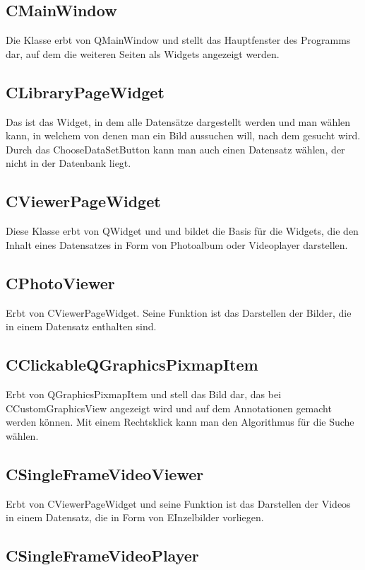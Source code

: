 \subsection*{CMainWindow}
Die Klasse erbt von QMainWindow und stellt das Hauptfenster des Programms dar, auf dem die weiteren Seiten als Widgets angezeigt werden.

\subsection*{CLibraryPageWidget}
Das ist das Widget, in dem alle Datensätze dargestellt werden und man wählen kann, in welchem von denen man ein Bild aussuchen will, nach dem gesucht wird. Durch das ChooseDataSetButton kann man auch einen Datensatz wählen, der nicht in der Datenbank liegt. 

\subsection*{CViewerPageWidget}
Diese Klasse erbt von QWidget und und bildet die Basis für die Widgets, die den Inhalt eines Datensatzes in Form von Photoalbum oder Videoplayer darstellen.

\subsection*{CPhotoViewer}
Erbt von CViewerPageWidget. Seine Funktion ist das Darstellen der Bilder, die in einem Datensatz enthalten sind.

\subsection*{CClickableQGraphicsPixmapItem}
Erbt von QGraphicsPixmapItem und stell das Bild dar, das bei CCustomGraphicsView angezeigt wird und auf dem Annotationen gemacht werden können. Mit einem Rechtsklick kann man den Algorithmus für die Suche wählen.

\subsection*{CSingleFrameVideoViewer}
Erbt von CViewerPageWidget und seine Funktion ist das Darstellen der Videos in einem Datensatz, die in Form von EInzelbilder vorliegen.

\subsection*{CSingleFrameVideoPlayer}


